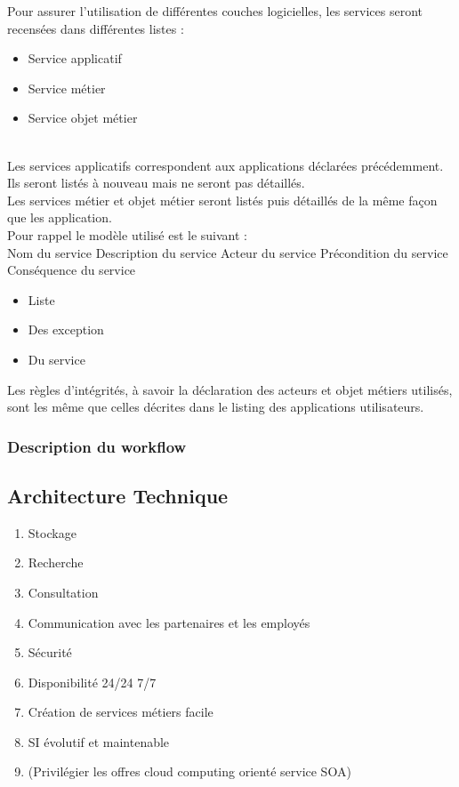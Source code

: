 Pour assurer l'utilisation de différentes couches logicielles, les services
seront recensées dans différentes listes : \\
\begin{itemize}
  \item Service applicatif
  \item Service métier
  \item Service objet métier
\end{itemize}

~\\

Les services applicatifs correspondent aux applications déclarées précédemment.
Ils seront listés à nouveau mais ne seront pas détaillés. \\

Les services métier et objet métier seront listés puis détaillés de la même
façon que les application. \\

Pour rappel le modèle utilisé est le suivant : \\

\CUBref
{Nom du service}
{Description du service}
{Acteur du service}
{Précondition du service}
{Conséquence du service}
{
  \begin{itemize}
    \item Liste
    \item Des exception
    \item Du service
  \end{itemize}
}

Les règles d'intégrités, à savoir la déclaration des acteurs et objet métiers
utilisés, sont les même que celles décrites dans le listing des applications
utilisateurs. \\

\subsubsection{Description du workflow}

\subsection{Architecture Technique}
\begin{enumerate}
  \item Stockage
  \item Recherche
  \item Consultation
  \item Communication avec les partenaires et les employés
  \item Sécurité
  \item Disponibilité 24/24 7/7
  \item Création de services métiers facile
  \item SI évolutif et maintenable
  \item (Privilégier les offres cloud computing orienté service SOA)
\end{enumerate}

